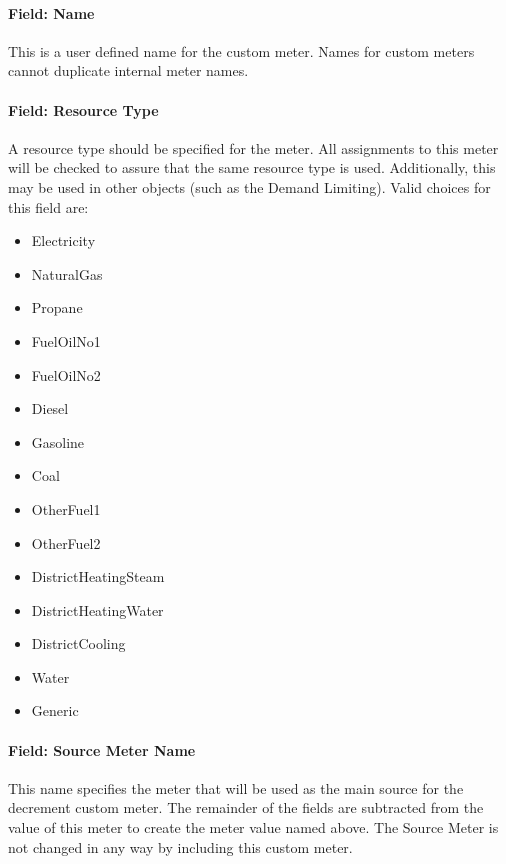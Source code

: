 \paragraph{Field: Name}\label{field-name-1-040}

This is a user defined name for the custom meter. Names for custom meters cannot duplicate internal meter names.

\paragraph{Field: Resource Type}\label{field-fuel-type-1-003}

A resource type should be specified for the meter. All assignments to this meter will be checked to assure that the same resource type is used. Additionally, this may be used in other objects (such as the Demand Limiting). Valid choices for this field are:

\begin{itemize}
    \item
    Electricity
    \item
    NaturalGas
    \item
    Propane
    \item
    FuelOilNo1
    \item
    FuelOilNo2
    \item
    Diesel
    \item
    Gasoline
    \item
    Coal
    \item
    OtherFuel1
    \item
    OtherFuel2
    \item
    DistrictHeatingSteam
    \item
    DistrictHeatingWater
    \item
    DistrictCooling
    \item
    Water
    \item
    Generic
\end{itemize}

\paragraph{Field: Source Meter Name}\label{field-source-meter-name}

This name specifies the meter that will be used as the main source for the decrement custom meter. The remainder of the fields are subtracted from the value of this meter to create the meter value named above. The Source Meter is not changed in any way by including this custom meter.


